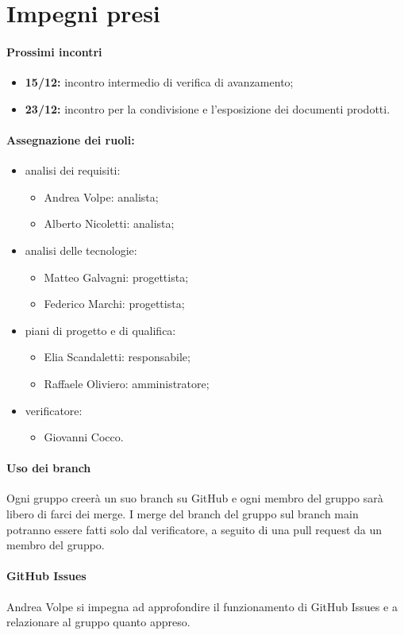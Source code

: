\documentclass[a4paper, 12pt]{article}
\begin{document}
\section{Impegni presi}
\paragraph{Prossimi incontri}
\begin{itemize}
\item \textbf{15/12:} incontro intermedio di verifica di avanzamento;
\item \textbf{23/12:} incontro per la condivisione e l'esposizione dei documenti prodotti.
\end{itemize}

\paragraph{Assegnazione dei ruoli:}
\begin{itemize}
\item analisi dei requisiti:
	\begin{itemize}
	\item Andrea Volpe: analista;
	\item Alberto Nicoletti: analista;
	\end{itemize}
\item analisi delle tecnologie:
	\begin{itemize}
	\item Matteo Galvagni: progettista;
	\item Federico Marchi: progettista;
	\end{itemize}
\item piani di progetto e di qualifica:
	\begin{itemize}
	\item Elia Scandaletti: responsabile;
	\item Raffaele Oliviero: amministratore;
	\end{itemize}
\item verificatore:
	\begin{itemize}
	\item Giovanni Cocco.
	\end{itemize}
\end{itemize}

\paragraph{Uso dei branch}
Ogni gruppo creerà un suo branch su GitHub e ogni membro del gruppo sarà libero di farci dei merge. I merge del branch del gruppo sul branch main potranno essere fatti solo dal verificatore, a seguito di una pull request da un membro del gruppo.

\paragraph{GitHub Issues}
Andrea Volpe si impegna ad approfondire il funzionamento di GitHub Issues e a relazionare al gruppo quanto appreso.
\end{document}
